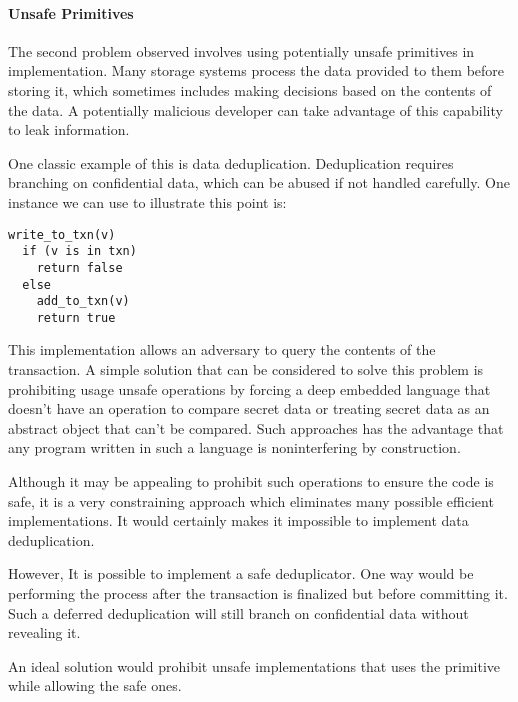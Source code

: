 \documentclass[onecolumn]{paper}
\begin{document}
\paragraph{Unsafe Primitives}
The second problem observed involves using potentially unsafe primitives in implementation. Many storage systems process the data provided to them before storing it, which sometimes includes making decisions based on the contents of the data. A potentially malicious developer can take advantage of this capability to leak information. 

One classic example of this is data deduplication. Deduplication requires branching on confidential data, which can be abused if not handled carefully. One instance we can use to illustrate this point is:

\begin{lstlisting}
write_to_txn(v)
  if (v is in txn)
    return false
  else
    add_to_txn(v)
    return true
\end{lstlisting}

This implementation allows an adversary to query the contents of the transaction. 
A simple solution that can be considered to solve this problem is prohibiting usage unsafe operations 
by forcing a deep embedded language that doesn't have an operation to compare secret data or treating secret
data as an abstract object that can't be compared. Such approaches has the advantage 
that any program written in such a language is noninterfering by construction.

Although it may be appealing to prohibit such operations to ensure the code is safe, it is a very constraining approach which eliminates many possible efficient implementations. It would certainly makes it impossible to implement data deduplication. 

However, It is possible to implement a safe deduplicator. One way would be performing the process after the transaction is finalized but before committing it. Such a deferred deduplication will still branch on confidential data without revealing it.

An ideal solution would prohibit unsafe implementations that uses the primitive while allowing the safe ones. 


\end{document}
